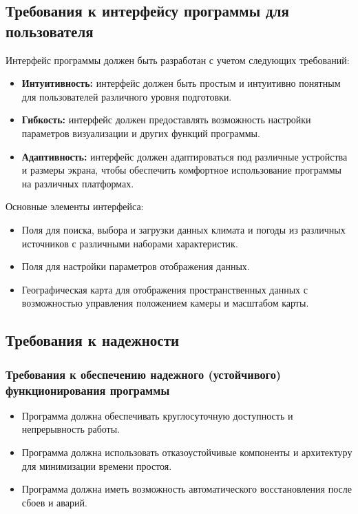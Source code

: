 \documentclass[a4paper, 12pt]{article}
\begin{document}
	\subsection{Требования к интерфейсу программы для пользователя}\label{section:4.2}
	Интерфейс программы должен быть разработан с учетом следующих требований:
	\begin{itemize}
		\item \textbf{Интуитивность:} интерфейс должен быть простым и интуитивно понятным для пользователей различного
			уровня подготовки.

		\item \textbf{Гибкость:} интерфейс должен предоставлять возможность настройки параметров визуализации и других
			функций программы.

		\item \textbf{Адаптивность:} интерфейс должен адаптироваться под различные устройства и размеры экрана, чтобы обеспечить
			комфортное использование программы на различных платформах.
	\end{itemize}

	Основные элементы интерфейса:
	\begin{itemize}
		\item Поля для поиска, выбора и загрузки данных климата и погоды из различных источников с различными наборами
			характеристик.

		\item Поля для настройки параметров отображения данных.

		\item Географическая карта для отображения пространственных данных с возможностью управления положением камеры и масштабом
			карты.
	\end{itemize}

	\subsection{Требования к надежности}\label{section:4.3}

	\subsubsection{Требования к обеспечению надежного (устойчивого) функционирования программы}\label{section:4.3.1}
	\begin{itemize}
		\item Программа должна обеспечивать круглосуточную доступность и непрерывность работы.

		\item Программа должна использовать отказоустойчивые компоненты и архитектуру для минимизации времени простоя.

		\item Программа должна иметь возможность автоматического восстановления после сбоев и аварий.
	\end{itemize}
\end{document}
